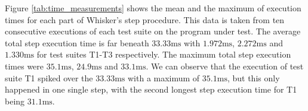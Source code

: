 \clearpage

Figure \ref{tab:time_measurements} shows the mean and the maximum of execution times for each part of Whisker's step procedure.
This data is taken from ten consecutive executions of each test suite on the program under test.
The average total step execution time is far beneath $33.33\text{ms}$ with $1.972\text{ms}$, $2.272\text{ms}$ and $1.330\text{ms}$ for test suites T1-T3 respectively.
The maximum total step execution times were $35.1\text{ms}$, $24.9\text{ms}$ and $33.1\text{ms}$.
We can observe that the execution of test suite T1 spiked over the $33.33\text{ms}$ with a maximum of $35.1\text{ms}$,
but this only happened in one single step, with the second longest step execution time for T1 being $31.1\text{ms}$.

%

